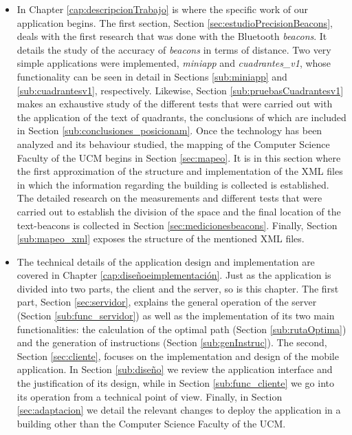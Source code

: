 \begin{itemize}
	\item In Chapter \ref{cap:descripcionTrabajo} is where the specific work of our application begins. The first section, Section \ref{sec:estudioPrecisionBeacons}, deals with the first research that was done with the Bluetooth \textit{beacons}. It details the study of the accuracy of \textit{beacons} in terms of distance. Two very simple applications were implemented, \textit{miniapp} and \textit{cuadrantes\_v1}, whose functionality can be seen in detail in Sections \ref{sub:miniapp} and \ref{sub:cuadrantesv1}, respectively. Likewise, Section \ref{sub:pruebasCuadrantesv1} makes an exhaustive study of the different tests that were carried out with the application of the text of quadrants, the conclusions of which are included in Section \ref{sub:conclusiones_posicionam}. Once the technology has been analyzed and its behaviour studied, the mapping of the Computer Science Faculty of the UCM begins in Section \ref{sec:mapeo}. It is in this section where the first approximation of the structure and implementation of the XML files in which the information regarding the building is collected is established. The detailed research on the measurements and different tests that were carried out to establish the division of the space and the final location of the text-beacons is collected in Section \ref{sec:medicionesbeacons}. Finally, Section \ref{sub:mapeo_xml} exposes the structure of the mentioned XML files.
	
	\item The technical details of the application design and implementation are covered in Chapter \ref{cap:diseñoeimplementación}. Just as the application is divided into two parts, the client and the server, so is this chapter. The first part, Section \ref{sec:servidor}, explains the general operation of the server (Section \ref{sub:func_servidor}) as well as the implementation of its two main functionalities: the calculation of the optimal path (Section \ref{sub:rutaOptima}) and the generation of instructions (Section \ref{sub:genInstruc}). The second, Section \ref{sec:cliente}, focuses on the implementation and design of the mobile application. In Section \ref{sub:diseño} we review the application interface and the justification of its design, while in Section \ref{sub:func_cliente} we go into its operation from a technical point of view. Finally, in Section \ref{sec:adaptacion} we detail the relevant changes to deploy the application in a building other than the Computer Science Faculty of the UCM.
	

\end{itemize}
